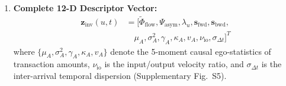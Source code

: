\begin{enumerate}[leftmargin=*]
\begin{align}
    \end{align}
    computed exclusively over causal historical subgraphs ($t_e \le t$). Seed indicator $\mathbf{s}_{\text{seed}}(u, t) = 1.0$ strictly if $u \in \mathcal{V}_{\text{illicit}}^{\text{train}}$ and confirmation timestamp $t_{\text{conf}}(u) \le t - \Delta T_{\text{delay}}$, and $0.0$ otherwise, where $\Delta T_{\text{delay}} \in [30, 90]$\,days models investigative delay. Truncated Power Iteration ($T_{\text{iter}}=3$, tolerance $\epsilon=10^{-4}$) over degree-capped graph $\mathcal{G}_t^{(K)}$ ($K \le 15$) ensures deterministic $O(K \cdot T_{\text{iter}})$ computation with $<0.08$\,ms overhead. All validation, calibration, and test nodes receive $\mathbf{s}_{\text{seed}}(u) \equiv 0.0$, strictly precluding label leakage.
    \item \textbf{Complete 12-D Descriptor Vector:}
    \begin{align}
    \mathbf{z}_{\text{inv}}(u, t) &= \big[ \tilde{\Phi}_{\text{flow}}, \Psi_{\text{asym}}, \lambda_u, \mathbf{s}_{\text{fwd}}, \mathbf{s}_{\text{bwd}}, \nonumber \\
    &\quad \mu_A, \sigma_A^2, \gamma_A, \kappa_A, v_A, \nu_{\text{io}}, \sigma_{\Delta t} \big]^T
    \end{align}
    where $\{\mu_A, \sigma_A^2, \gamma_A, \kappa_A, v_A\}$ denote the 5-moment causal ego-statistics of transaction amounts, $\nu_{\text{io}}$ is the input/output velocity ratio, and $\sigma_{\Delta t}$ is the inter-arrival temporal dispersion (Supplementary Fig.~S5).
\end{enumerate}

